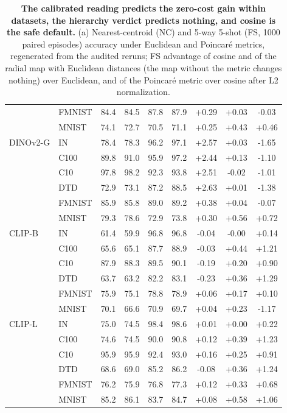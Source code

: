 \begin{table}[H]
\begin{tabular}{llccccccc}
 & FMNIST & 84.4 & 84.5 & 87.8 & 87.9 & +0.29 & +0.03 & -0.03 \\
 & MNIST & 74.1 & 72.7 & 70.5 & 71.1 & +0.25 & +0.43 & +0.46 \\
\midrule
DINOv2-G & IN & 78.4 & 78.3 & 96.2 & 97.1 & +2.57 & +0.03 & -1.65 \\
 & C100 & 89.8 & 91.0 & 95.9 & 97.2 & +2.44 & +0.13 & -1.10 \\
 & C10 & 97.8 & 98.2 & 92.3 & 93.8 & +2.51 & -0.02 & -1.01 \\
 & DTD & 72.9 & 73.1 & 87.2 & 88.5 & +2.63 & +0.01 & -1.38 \\
 & FMNIST & 85.9 & 85.8 & 89.0 & 89.2 & +0.38 & +0.04 & -0.07 \\
 & MNIST & 79.3 & 78.6 & 72.9 & 73.8 & +0.30 & +0.56 & +0.72 \\
\midrule
CLIP-B & IN & 61.4 & 59.9 & 96.8 & 96.8 & -0.04 & -0.00 & +0.14 \\
 & C100 & 65.6 & 65.1 & 87.7 & 88.9 & -0.03 & +0.44 & +1.21 \\
 & C10 & 87.9 & 88.3 & 89.5 & 90.1 & -0.19 & +0.20 & +0.90 \\
 & DTD & 63.7 & 63.2 & 82.2 & 83.1 & -0.23 & +0.36 & +1.29 \\
 & FMNIST & 75.9 & 75.1 & 78.8 & 78.9 & +0.06 & +0.17 & +0.10 \\
 & MNIST & 70.1 & 66.6 & 70.9 & 69.7 & +0.04 & +0.23 & -1.17 \\
\midrule
CLIP-L & IN & 75.0 & 74.5 & 98.4 & 98.6 & +0.01 & +0.00 & +0.22 \\
 & C100 & 74.6 & 74.5 & 90.0 & 90.8 & +0.12 & +0.39 & +1.23 \\
 & C10 & 95.9 & 95.9 & 92.4 & 93.0 & +0.16 & +0.25 & +0.91 \\
 & DTD & 68.6 & 69.0 & 85.2 & 86.2 & -0.08 & +0.36 & +1.24 \\
 & FMNIST & 76.2 & 75.9 & 76.8 & 77.3 & +0.12 & +0.33 & +0.68 \\
 & MNIST & 85.2 & 86.1 & 83.7 & 84.7 & +0.08 & +0.58 & +1.06 \\
\bottomrule
\end{tabular}
\par\vspace{5pt}
\endgroup
\caption{\textbf{The calibrated reading predicts the zero-cost gain within datasets, the hierarchy verdict predicts nothing, and cosine is the safe default.} (a) Nearest-centroid (NC) and 5-way 5-shot (FS, 1000 paired episodes) accuracy under Euclidean and Poincar\'e metrics, regenerated from the audited reruns; FS advantage of cosine and of the radial map with Euclidean distances (the map without the metric changes nothing) over Euclidean, and of the Poincar\'e metric over cosine after L2 normalization. %
}
\label{tab:q9-corollary}
\end{table}
